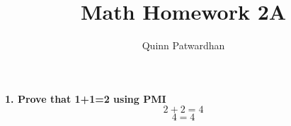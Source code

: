 \documentclass{article}
\title{Math Homework 2A}
\author{Quinn Patwardhan}
\begin{document}
\maketitle
\textbf{1. Prove that 1+1=2 using PMI}
\[2+2=4\]
\[4=4\]
\end{document}
